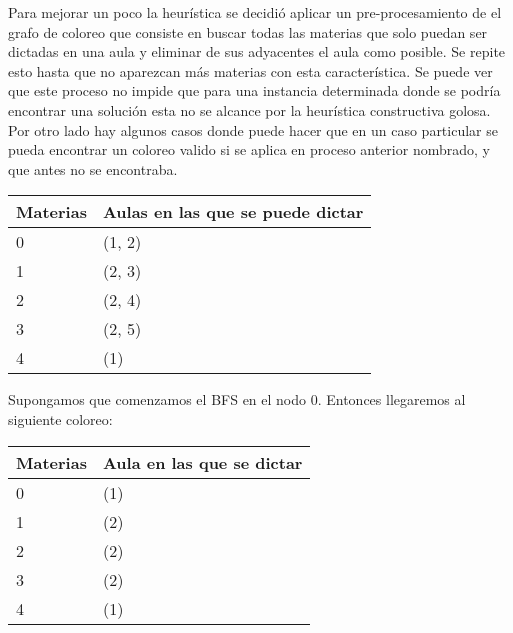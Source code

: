 Para mejorar un poco la heurística se decidió aplicar un pre-procesamiento de el grafo de coloreo que consiste en buscar todas las materias que solo puedan ser dictadas en una
aula y eliminar de sus adyacentes el aula como posible. Se repite esto hasta que no aparezcan más materias con esta característica. Se puede ver que este proceso no impide que 
para una instancia determinada donde se podría encontrar una solución esta no se alcance por la heurística constructiva golosa. Por otro lado hay algunos casos donde puede hacer
que en un caso particular se pueda encontrar un coloreo valido si se aplica en proceso anterior nombrado, y que antes no se encontraba.



\begin{table}[H]
\begin{center}
\begin{tabular}{|l|l|}
\hline
Materias & Aulas en las que se puede dictar \\
\hline \hline
0 & (1, 2) \\ \hline
1 & (2, 3) \\ \hline
2 & (2, 4) \\ \hline
3 & (2, 5) \\ \hline
4 & (1) \\ \hline
\end{tabular}
\end{center}
\end{table}

Supongamos que comenzamos el BFS en el nodo 0. Entonces llegaremos al siguiente coloreo:

\begin{table}[H]
\begin{center}
\begin{tabular}{|l|l|}
\hline
Materias & Aula en las que se dictar \\
\hline \hline
0 & (1) \\ \hline
1 & (2) \\ \hline
2 & (2) \\ \hline
3 & (2) \\ \hline
4 & (1) \\ \hline
\end{tabular}
\end{center}
\end{table}

